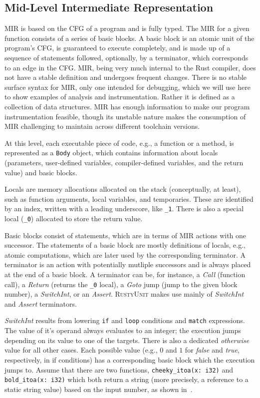 \documentclass[paper=a4,%
  twoside,%
  BCOR4mm,%
  abstract=true,%
  toc=bibliography,%
  chapterprefix=true,%
  toc=bibliographynumbered,%
  open=right,%
  english,%
  pagesize=pdftex]{scrreprt}
\newcommand{\tech}{\textsc{RustyUnit}\xspace}
\newcommand{\mir}{\ac{MIR}\xspace}
\newcommand{\cfg}{\ac{CFG}\xspace}
\begin{document}
\subsection{Mid-Level Intermediate Representation}
\mir is based on the \cfg of a program and is fully typed. The \mir for a given function consists of a series of basic blocks. A basic block is an atomic unit of the program's \cfg, is guaranteed to execute completely, and is made up of a sequence of statements followed, optionally, by a terminator, which corresponds to an edge in the \cfg. \mir, being very much internal to the Rust compiler, does not have a stable definition and undergoes frequent changes. There is no stable surface syntax for \mir, only one intended for debugging, which we will use here to show examples of analysis and instrumentation. Rather it is defined as a collection of data structures. \mir has enough information to make our program instrumentation feasible, though its unstable nature makes the consumption of \mir challenging to maintain across different toolchain versions.

At this level, each executable piece of code, e.g., a function or a method, is represented as a \texttt{Body} object, which contains information about locals (parameters, user-defined variables, compiler-defined variables, and the return value) and basic blocks.

Locals are memory allocations allocated on the stack (conceptually, at least), such as function arguments, local variables, and temporaries. These are identified by an index, written with a leading underscore, like \texttt{\string_1}. There is also a special local (\texttt{\string_0}) allocated to store the return value. 

Basic blocks consist of statements, which are in terms of \mir actions with one successor. The statements of a basic block are mostly definitions of locals, e.g., atomic computations, which are later used by the corresponding terminator. A terminator is an action with potentially mutliple successors and is always placed at the end of a basic block. A terminator can be, for instance, a \emph{Call} (function call), a \emph{Return} (returns the \texttt{\string_0} local), a \emph{Goto} jump (jump to the given block number), a \emph{SwitchInt}, or an \emph{Assert}. \tech makes use mainly of \emph{SwitchInt} and \emph{Assert} terminators. 

\emph{SwitchInt} results from lowering \texttt{if} and \texttt{loop} conditions and \texttt{match} expressions. The value of it's operand always evaluates to an integer; the execution jumps depending on its value to one of the targets. There is also a dedicated \emph{otherwise} value for all other cases. Each possible value (e.g., $0$ and $1$ for \emph{false} and \emph{true}, respectively, in if conditions) has a corresponding basic block which the execution jumps to. Assume that there are two functions, \texttt{cheeky\string_itoa(x: i32)} and \texttt{bold\string_itoa(x: i32)} which both return a string (more precisely, a reference to a static string value) based on the input number, as shown in~.
\end{document}
